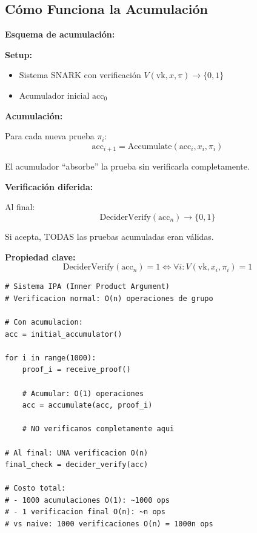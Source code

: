 \documentclass[11pt,a4paper,twoside]{book}
\begin{document}
\subsection{C\'omo Funciona la Acumulaci\'on}

\begin{mathnote}
\textbf{Esquema de acumulaci\'on:}

\textbf{Setup:}
\begin{itemize}
    \item Sistema SNARK con verificaci\'on $V(\text{vk}, x, \pi) \to \{0, 1\}$
    \item Acumulador inicial $\text{acc}_0$
\end{itemize}

\textbf{Acumulaci\'on:}

Para cada nueva prueba $\pi_i$:
\[ \text{acc}_{i+1} = \text{Accumulate}(\text{acc}_i, x_i, \pi_i) \]

El acumulador ``absorbe'' la prueba sin verificarla completamente.

\textbf{Verificaci\'on diferida:}

Al final:
\[ \text{DeciderVerify}(\text{acc}_n) \to \{0, 1\} \]

Si acepta, TODAS las pruebas acumuladas eran v\'alidas.

\textbf{Propiedad clave:}
\[ \text{DeciderVerify}(\text{acc}_n) = 1 \iff \forall i: V(\text{vk}, x_i, \pi_i) = 1 \]
\end{mathnote}

\begin{example}
\begin{lstlisting}[style=python]
# Sistema IPA (Inner Product Argument)
# Verificacion normal: O(n) operaciones de grupo

# Con acumulacion:
acc = initial_accumulator()

for i in range(1000):
    proof_i = receive_proof()
    
    # Acumular: O(1) operaciones
    acc = accumulate(acc, proof_i)
    
    # NO verificamos completamente aqui

# Al final: UNA verificacion O(n)
final_check = decider_verify(acc)

# Costo total:
# - 1000 acumulaciones O(1): ~1000 ops
# - 1 verificacion final O(n): ~n ops
# vs naive: 1000 verificaciones O(n) = 1000n ops
\end{lstlisting}
\end{example}
\end{document}
